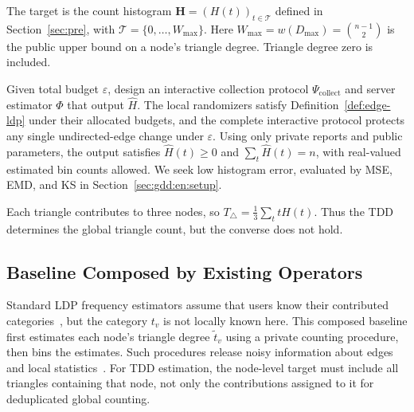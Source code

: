 The target is the count histogram $\mathbf H=(H(t))_{t\in\mathcal T}$ defined in Section~\ref{sec:pre}, with $\mathcal T=\{0,\ldots,W_{\max}\}$. Here $W_{\max}=w(D_{\max})=\binom{n-1}{2}$ is the public upper bound on a node's triangle degree. Triangle degree zero is included.
\begin{definition}
\label{def:ldp-gdd-estimation}
Given total budget $\varepsilon$, design an interactive collection protocol $\Psi_{\mathrm{collect}}$ and server estimator $\Phi$ that output $\widehat{H}$. The local randomizers satisfy Definition~\ref{def:edge-ldp} under their allocated budgets, and the complete interactive protocol protects any single undirected-edge change under $\varepsilon$. Using only private reports and public parameters, the output satisfies $\widehat H(t)\ge0$ and $\sum_t\widehat H(t)=n$, with real-valued estimated bin counts allowed. We seek low histogram error, evaluated by MSE, EMD, and KS in Section~\ref{sec:gdd:en:setup}.
\end{definition}
Each triangle contributes to three nodes, so $T_\triangle=\frac13\sum_t tH(t)$. Thus the TDD determines the global triangle count, but the converse does not hold.


\subsection{Baseline Composed by Existing Operators}
\label{subsec:direct-composition}
Standard LDP frequency estimators assume that users know their contributed categories~\cite{LDPGDDWang2017,kairouz2016discrete,bassily2015succinct}, but the category $t_v$ is not locally known here. 
This composed baseline first estimates each node's triangle degree $\widetilde t_v$ using a private counting procedure, then bins the estimates.
Such procedures release noisy information about edges and local statistics~\cite{he2025robust,dong2026ldpgraph}. 
For TDD estimation, the node-level target must include all triangles containing that node, not only the contributions assigned to it for deduplicated global counting.


